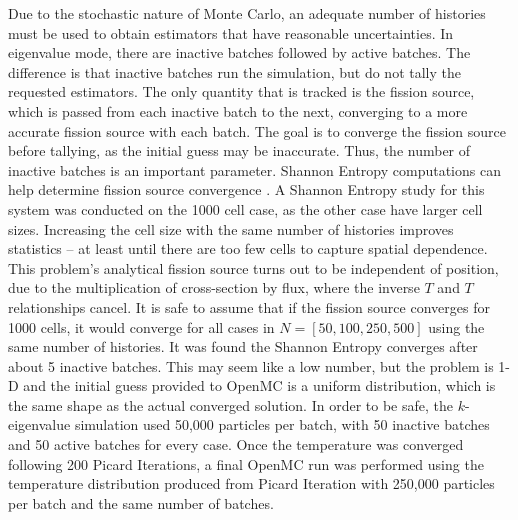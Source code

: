 \documentclass[letterpaper]{mc2023}
\begin{document}
Due to the stochastic nature of Monte Carlo, an adequate number of histories must be used to obtain estimators that have reasonable
uncertainties. In eigenvalue mode, there are inactive batches followed by active batches. The difference is that inactive batches run
the simulation, but do not tally the requested estimators. The only quantity that is tracked is the fission source, which is passed from
each inactive batch to the next, converging to a more accurate fission source with each batch. The goal is to converge the fission source
before tallying, as the initial guess may be inaccurate. Thus, the number of inactive batches is an important parameter. Shannon Entropy
computations can help determine fission source convergence \cite{brown-entropy-2006}. A Shannon Entropy study for this system was conducted
on the 1000 cell case, as the other case have larger cell sizes. Increasing the cell size with the same number of histories improves
statistics -- at least until there are  too few cells to capture spatial dependence. This problem's analytical fission source turns out to
be independent of position, due to the multiplication of cross-section by flux, where the inverse $T$ and $T$ relationships cancel. It is
safe to assume that if the fission source converges for 1000 cells, it would converge for all cases in $N=[50,100,250,500]$ using the same
number of histories. It was found the Shannon Entropy converges after about 5 inactive batches. This may seem like a low number, but the
problem is 1-D and the initial guess provided to OpenMC is a uniform distribution, which is the same shape as the actual converged solution.
In order to be safe, the $k$-eigenvalue simulation used 50,000 particles per batch, with 50 inactive batches and 50 active batches for every
case. Once the temperature was converged following 200 Picard Iterations, a final OpenMC run was performed using the temperature distribution
produced from Picard Iteration with 250,000 particles per batch and the same number of batches.
\end{document}
